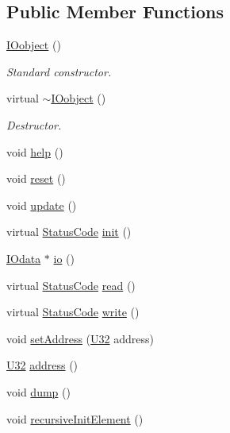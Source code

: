 \subsection*{Public Member Functions}
\begin{DoxyCompactItemize}
\item 
\hyperlink{classIOobject_a0c3f5a9fcc09892e99a4c977f4318a0b}{IOobject} ()
\begin{DoxyCompactList}\small\item\em Standard constructor. \item\end{DoxyCompactList}\item 
virtual \hyperlink{classIOobject_a1db3f3f5d07a00a0b4cd47b2a0222f84}{$\sim$IOobject} ()
\begin{DoxyCompactList}\small\item\em Destructor. \item\end{DoxyCompactList}\item 
void \hyperlink{classIOobject_a0520d82a9773c764fbaede59fe6f8a17}{help} ()
\item 
void \hyperlink{classIOobject_abccbc7a65366ec1257ff41a8e3245af8}{reset} ()
\item 
void \hyperlink{classIOobject_a0100b4ddcfe8f0b551a3f0dc5201988d}{update} ()
\item 
virtual \hyperlink{classStatusCode}{StatusCode} \hyperlink{classIOobject_ab989e175734dd73797343e63cec6b174}{init} ()
\item 
\hyperlink{classIOdata}{IOdata} $\ast$ \hyperlink{classIOobject_af04fb94137c3d86849f478ac5afab5d1}{io} ()
\item 
virtual \hyperlink{classStatusCode}{StatusCode} \hyperlink{classIOobject_aa07610c11963b1db6710e3c76ceea456}{read} ()
\item 
virtual \hyperlink{classStatusCode}{StatusCode} \hyperlink{classIOobject_a9f6984bc9f0fadcf800f1be2523ac744}{write} ()
\item 
void \hyperlink{classIOobject_ae0d372aaeafe3da3c239677118deb2ac}{setAddress} (\hyperlink{classIOobject_ad5bc21e44080074fe1068dc83861a090}{U32} address)
\item 
\hyperlink{classIOobject_ad5bc21e44080074fe1068dc83861a090}{U32} \hyperlink{classIOobject_a95f0d3f092ea1ae3037ac60f0674d095}{address} ()
\item 
void \hyperlink{classIOobject_a1247f08c84c1732a76caf07e987871e9}{dump} ()
\item 
void \hyperlink{classElement_a3c0abcb36f8906688bb7e32608df7086}{recursiveInitElement} ()

\end{DoxyCompactItemize}
